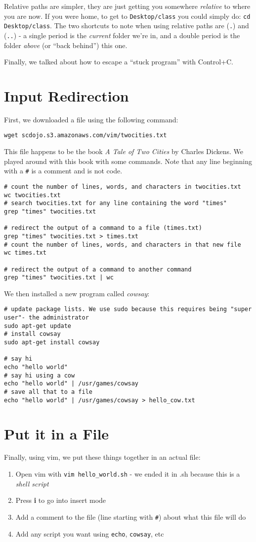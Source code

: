 \documentclass{article}
\begin{document}
Relative paths are simpler, they are just getting you somewhere
\textit{relative} to where you are now. If you were home, to get to
\texttt{Desktop/class} you could simply do: \texttt{cd Desktop/class}.
The two shortcuts to note when using relative paths are (\texttt{.}) and
(\texttt{..}) - a single period is the \textit{current} folder we're in, and a
double period is the folder \textit{above} (or ``back behind'') this one.

Finally, we talked about how to escape a ``stuck program'' with Control+C.

\section*{Input Redirection}
First, we downloaded a file using the following command:
\begin{lstlisting}
wget scdojo.s3.amazonaws.com/vim/twocities.txt
\end{lstlisting}
This file happens to be the book \textit{A Tale of Two Cities} by Charles
Dickens. We played around with this book with some commands. Note that any line
beginning with a \texttt{\#} is a comment and is not code.
\begin{lstlisting}
# count the number of lines, words, and characters in twocities.txt
wc twocities.txt
# search twocities.txt for any line containing the word "times"
grep "times" twocities.txt

# redirect the output of a command to a file (times.txt)
grep "times" twocities.txt > times.txt
# count the number of lines, words, and characters in that new file
wc times.txt

# redirect the output of a command to another command
grep "times" twocities.txt | wc
\end{lstlisting}
We then installed a new program called \textit{cowsay}:
\begin{lstlisting}
# update package lists. We use sudo because this requires being "super user"- the administrator
sudo apt-get update
# install cowsay
sudo apt-get install cowsay

# say hi
echo "hello world"
# say hi using a cow
echo "hello world" | /usr/games/cowsay
# save all that to a file
echo "hello world" | /usr/games/cowsay > hello_cow.txt
\end{lstlisting}

\section*{Put it in a File}
Finally, using vim, we put these things together in an actual file:
\begin{enumerate}
    \item Open vim with \texttt{vim hello\_world.sh} - we ended it in .sh because this is a \textit{shell script}
    \item Press \textbf{i} to go into insert mode
    \item Add a comment to the file (line starting with \texttt{\#}) about what this file will do
    \item Add any script you want using \texttt{echo}, \texttt{cowsay}, etc
\end{enumerate}
\end{document}
